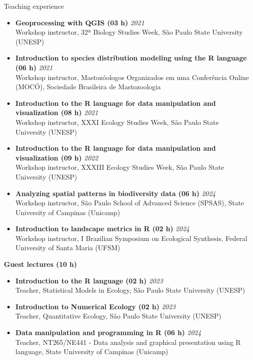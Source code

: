 \documentclass{resume}
\begin{document}
\begin{rSection}{Teaching experience}
\begin{itemize}
\item {\bf Geoprocessing with QGIS (03 h)} \hfill{\em 2021}\\
Workshop instructor, 32ª Biology Studies Week, São Paulo State University (UNESP)

\item {\bf Introduction to species distribution modeling using the R language (06 h)} \hfill{\em 2021}\\
Workshop instructor, Mastozóologos Organizados em uma Conferência Online (MOCÓ), Sociedade Brasileira de Mastozoologia

\item {\bf Introduction to the R language for data manipulation and visualization (08 h)} \hfill{\em 2021}\\
Workshop instructor, XXXI Ecology Studies Week, São Paulo State University (UNESP)

\item {\bf Introduction to the R language for data manipulation and visualization (09 h)} \hfill{\em 2022}\\
Workshop instructor, XXXIII Ecology Studies Week, São Paulo State University (UNESP)

\item {\bf Analyzing spatial patterns in biodiversity data (06 h)} \hfill{\em 2024}\\
Workshop instructor, São Paulo School of Advanced Science (SPSAS), State University of Campinas (Unicamp)

\item {\bf Introduction to landscape metrics in R (02 h)} \hfill{\em 2024}\\
Workshop instructor, I Brazilian Symposium on Ecological Synthesis, Federal University of Santa Maria (UFSM)
\end{itemize}

{\bf Guest lectures (10 h)}
\begin{itemize}
\item {\bf Introduction to the R language (02 h)} \hfill{\em 2023}\\
Teacher, Statistical Models in Ecology, São Paulo State University (UNESP) 

\item {\bf Introduction to Numerical Ecology (02 h)} \hfill{\em 2023}\\
Teacher, Quantitative Ecology, São Paulo State University (UNESP)

\item {\bf Data manipulation and programming in R (06 h)} \hfill{\em 2024}\\
Teacher, NT265/NE441 - Data analysis and graphical presentation using R language, State University of Campinas (Unicamp)
\end{itemize}
\end{rSection}
\end{document}
